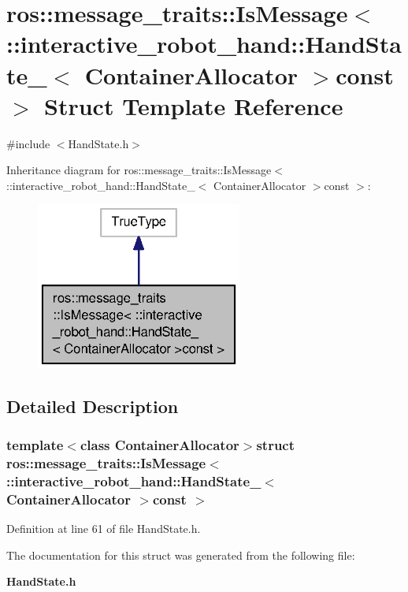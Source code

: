 \section{ros\-:\-:message\-\_\-traits\-:\-:Is\-Message$<$ \-:\-:interactive\-\_\-robot\-\_\-hand\-:\-:Hand\-State\-\_\-$<$ Container\-Allocator $>$const $>$ Struct Template Reference}
\label{structros_1_1message__traits_1_1IsMessage_3_01_1_1interactive__robot__hand_1_1HandState___3_01Coff2e1fc790e9fdff3e5184960f1dfe12}


{\ttfamily \#include $<$Hand\-State.\-h$>$}



Inheritance diagram for ros\-:\-:message\-\_\-traits\-:\-:Is\-Message$<$ \-:\-:interactive\-\_\-robot\-\_\-hand\-:\-:Hand\-State\-\_\-$<$ Container\-Allocator $>$const $>$\-:\nopagebreak
\begin{figure}[H]
\begin{center}
\leavevmode
\includegraphics[width=192pt]{structros_1_1message__traits_1_1IsMessage_3_01_1_1interactive__robot__hand_1_1HandState___3_01Co8f7ec3ed6f6d28a521dd1e29fe2b9385}
\end{center}
\end{figure}


\subsection{Detailed Description}
\subsubsection*{template$<$class Container\-Allocator$>$struct ros\-::message\-\_\-traits\-::\-Is\-Message$<$ \-::interactive\-\_\-robot\-\_\-hand\-::\-Hand\-State\-\_\-$<$ Container\-Allocator $>$const  $>$}



Definition at line 61 of file Hand\-State.\-h.



The documentation for this struct was generated from the following file\-:\begin{DoxyCompactItemize}
\item 
{\bf Hand\-State.\-h}\end{DoxyCompactItemize}
